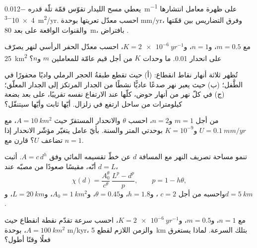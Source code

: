 \begin{exercise}[$\star$]\label{exo:b3:quantitative-geomorphology:2}
يعطي مسح الليدار تقوّس قمّة تلّة قدره \qty{-0.012}{m^{-1}} على ظهرة
معامل انتشارها \qty{4e-3}{m^2/yr}. احسب معدّل تعريتها بوحدة
\unit{mm/yr}، وفرق التضاريس بين قمّتها والقنوات
الواقعة على بعد \qty{80}{m}، بافتراض .
\end{exercise}

\begin{exercise}[$\star$]\label{exo:b3:quantitative-geomorphology:3}
مع $m = 0.5$، و$n = 1$، و$K = \qty{2e-6}{yr^{-1}}$، احسب معدّل
الحفر الرأسي لنهر يصرّف \qty{25}{km^2} على انحدار 0.01.
ما وحدات $K$ من أجل قيم عامّة للمعاملين $m$ و$n$؟
\end{exercise}

\begin{exercise}[$\star$]\label{exo:b3:quantitative-geomorphology:4}
تُظهر ثلاثة أنهار نقاط انقطاع: (أ) حيث تقطع طبقةُ الحجر الرملي واديًا
محفورًا في الطَّفل؛ (ب) حيث يعبر نهر صدعًا عاديًّا نشطًا من
الجدار المرتكز إلى الجدار المعلّق؛ (ج) في كلّ نهر من أنهار حوض، كلّها
عند الارتفاع نفسه تقريبًا، على بعد بضعة كيلومترات من ساحل ارتفع في
زلزال. أيّها ثابت وأيّها سيتنقّل؟
\end{exercise}

\begin{exercise}[$\star\star$]\label{exo:b3:quantitative-geomorphology:5}
من أجل $m = 1$ و$n = 2$، احسب $\theta$ والانحدار المستقرّ حيث $A =
\qty{10}{km^2}$، مع $U = \qty{0.1}{mm/yr}$ و$K = 10^{-9}$ بوحدتي
المتر والسنة.
بأيّ عامل يتغيّر مؤشّر الانحدار إذا تضاعف $U$؟ قارن مع $n =
1$.
\end{exercise}

\begin{exercise}[$\star\star$]\label{exo:b3:quantitative-geomorphology:6}
تنمو مساحة تصريف النهر مع المسافة $d$ عن خطّ تقسيمه المائي وفق $A =
c\,d^{h}$. أثبت أنّه، مقيسًا صعودًا من مصبّه عند $d = L$،
\[
\chi(d) = \frac{A_0^{\theta}}{c^{\theta}}\,\frac{L^{p} - d^{p}}{p},
\qquad p = 1 - h\theta ,
\]
واحسبه من أجل $c = 2$ ، و$h = 1.8$، و$\theta = 0.45$، و$A_0 =
\qty{1}{km^2}$، و$L = \qty{20}{km}$، و$d = \qty{5}{km}$.
\end{exercise}

\begin{exercise}[$\star\star$]\label{exo:b3:quantitative-geomorphology:7}
مع $n = 1$، و$m = 0.5$، و$K = \qty{2e-6}{yr^{-1}}$، احسب
سرعة تقدّم نقطة انقطاع حيث $A = \qty{100}{km^2}$، بوحدة m/kyr، والزمن
اللازم لقطع \qty{5}{km} بتلك السرعة. لماذا يستغرق
فعلًا وقتًا أطول؟
\end{exercise}

